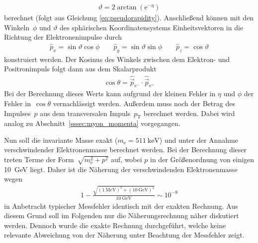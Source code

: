 \documentclass[11pt, a4paper]{article}
\numberwithin{equation}{section}
\begin{document}
\begin{align*}
	\vartheta = 2 \arctan\left( \mathrm{e}^{-\eta} \right)
\end{align*}
berechnet (folgt aus Gleichung \ref{eq:pseudorapidity}).
Anschließend können mit den Winkeln~$\phi$ und $\vartheta$ des sphärischen Koordinatensystems Einheitsvektoren in die Richtung der Elektronenimpulse durch
\begin{align*}
	\hat{p}_x = \sin\vartheta \cos\phi \qquad
	\hat{p}_y = \sin\vartheta \sin\phi \qquad
	\hat{p}_z = \cos\vartheta
\end{align*}
konstruiert werden.
Der Kosinus des Winkels zwischen dem Elektron- und Positronimpuls folgt dann aus dem Skalarprodukt
\begin{align*}
	\cos \theta = \hat{\vec{p}}_{\mathrm{e}^-} \cdot \hat{\vec{p}}_{\mathrm{e}^+}
\end{align*}
Bei der Berechnung dieses Werts kann aufgrund der kleinen Fehler in $\eta$ und $\phi$ der Fehler in~$\cos\theta$ vernachlässigt werden.
Außerdem muss noch der Betrag des Impulses~$p$ aus dem transversalen Impuls~$p_\mathrm{T}$ berechnet werden.
Dabei wird analog zu Abschnitt~\ref{sssec:myon_momenta} vorgegangen.

Nun soll die invariante Masse exakt ($m_\mathrm{e} = \SI{511}{\keV}$) und unter der Annahme verschwindender Elektronenmasse berechnet werden.
Bei der Berechnung dieser treten Terme der Form~$\sqrt{m_\mathrm{e}^2 + p^2}$ auf, wobei $p$ in der Größenordnung von einigen \SI{10}{\GeV} liegt.
Daher ist die Näherung der verschwindenden Elektronenmasse wegen
\begin{align*}
	1 - \frac{\sqrt{(\SI{1}{\MeV})^2 + (\SI{10}{\GeV})^2}}{\SI{10}{\GeV}} \sim 10^{-8}
\end{align*}
in Anbetracht typischer Messfehler identisch mit der exakten Rechnung.
Aus diesem Grund soll im Folgenden nur die Näherungsrechnung näher diskutiert werden.
Dennoch wurde die exakte Rechnung durchgeführt, welche keine relevante Abweichung von der Näherung unter Beachtung der Messfehler zeigt.
\end{document}

